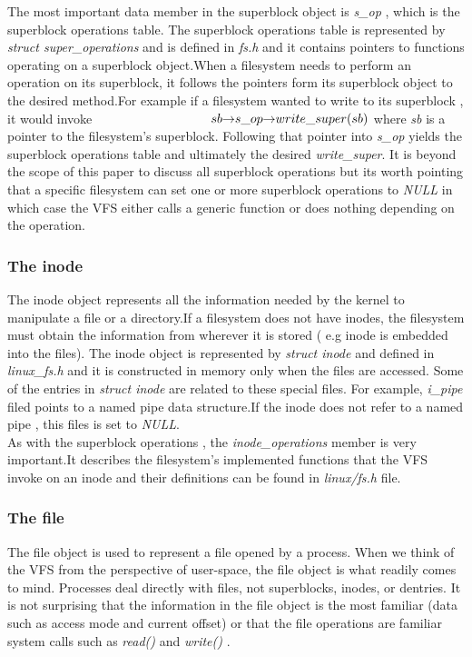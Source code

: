 \documentclass[conference]{IEEEtran}
\begin{document}
The most important data member in the superblock object is {\em s\_op }, which is the superblock operations table. The superblock operations table
is represented by {\em struct super\_operations } and is defined in {\em fs.h} and it contains pointers
to functions operating on a superblock object.When a filesystem needs to perform an operation on its superblock,
it follows the pointers form its superblock object to the desired method.For example if a filesystem wanted to 
write to its superblock , it would invoke 
\begin{math}\indent\indent\indent\indent\indent\indent sb{\rightarrow}s\_op{\rightarrow}write\_super(sb) \\
\end{math}
where {\em sb} is a pointer to the filesystem's superblock. Following that pointer into {\em s\_op} yields the
superblock operations table and ultimately the desired {\em write\_super}. It is beyond the scope of this paper
to discuss all superblock operations but its worth pointing that a specific filesystem can set one or more superblock 
operations to {\em NULL} in which case the VFS either calls a generic function or does nothing depending on the operation.

\subsubsection{The inode}

The inode object represents all the information needed by the kernel to manipulate a file or a directory.If a filesystem
does not have inodes, the filesystem must obtain the information from wherever it is stored ( e.g inode is embedded into the files).
The inode object is represented by {\em struct inode} and defined in {\em linux\_fs.h} and it is constructed
in memory only when the files are accessed. Some of the entries in {\em struct inode} are related to 
these special files. For example, {\em i\_pipe} filed points to a named pipe data structure.If the inode does not 
refer to a named pipe , this files is set to {\em NULL}.\\ 

As with the superblock operations , the {\em inode\_operations}
member is very important.It describes the filesystem's implemented functions that the VFS invoke on an inode and their
definitions can be found in {\em linux/fs.h } file. \\

\subsubsection{The file}
The file object is used to represent a file opened by a process. When we think of the VFS from the 
perspective of user-space, the file object is what readily comes to mind. Processes deal directly with 
files, not superblocks, inodes, or dentries. It is not surprising that the information in the file object 
is the most familiar (data such as access mode and current offset) or that the file operations are 
familiar system calls such as {\em read() } and {\em write() }. \\
\end{document}
